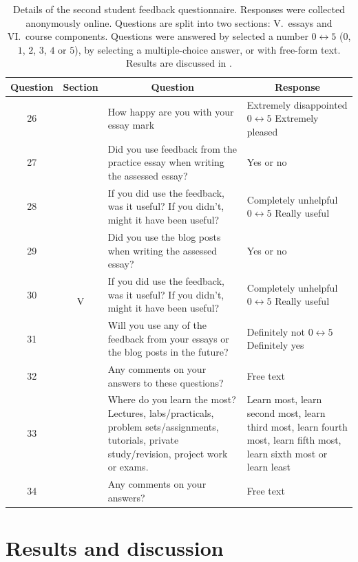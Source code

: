 \begin{table}\scriptsize
\centering
\begin{tabular}{c c p{2in} p{2in}}
\toprule
\multicolumn{1}{c}{Question} & \multicolumn{1}{c}{Section} & \multicolumn{1}{c}{Question} & \multicolumn{1}{c}{Response} \\
\midrule 
26 & \multirow{17}{*}{V} & How happy are you with your essay mark & Extremely disappointed $0 \leftrightarrow 5$ Extremely pleased \\
27 &		& Did you use feedback from the practice essay when writing the assessed essay? & Yes or no \\
28 & 	& If you did use the feedback, was it useful? If you didn't, might it have been useful? & Completely unhelpful $0 \leftrightarrow 5$ Really useful \\
29 &		& Did you use the blog posts when writing the assessed essay? & Yes or no \\
30 & 	& If you did use the feedback, was it useful? If you didn't, might it have been useful? & Completely unhelpful $0 \leftrightarrow 5$ Really useful \\
31 & 	& Will you use any of the feedback from your essays or the blog posts in the future? & Definitely not $0 \leftrightarrow 5$ Definitely yes \\
32 &		& Any comments on your answers to these questions? & Free text \\
\midrule
33 & \multirow{5}{*}{VI} & Where do you learn the most? Lectures, labs/practicals, problem sets/assignments, tutorials, private study/revision, project work or exams. & Learn most, learn second most, learn third most, learn fourth most, learn fifth most, learn sixth most or learn least\\
34 &	& Any comments on your answers? & Free text \\
 \bottomrule
\end{tabular}
\caption{Details of the second student feedback questionnaire. Responses were collected anonymously online. Questions are split into two sections: V.\ essays and VI.\ course components. Questions were answered by selected a number $0 \leftrightarrow 5$ ($0$, $1$, $2$, $3$, $4$ or $5$), by selecting a multiple-choice answer, or with free-form text. Results are discussed in .}\label{tab:form2}
\end{table}

\section{Results and discussion}\label{sec:results}

